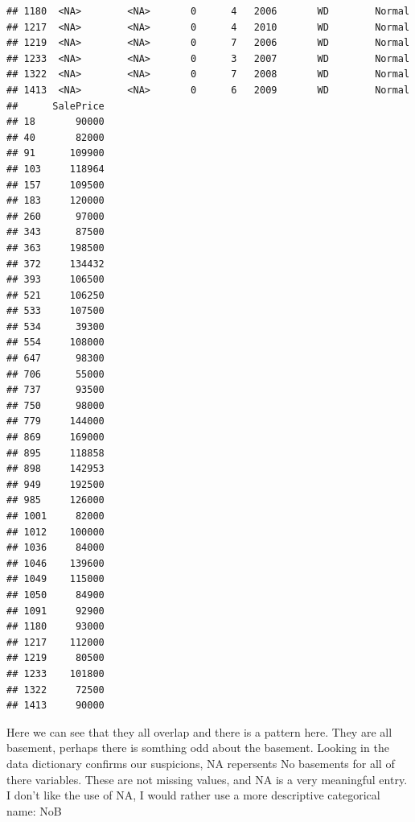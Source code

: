 \documentclass[]{article}
\begin{document}
\begin{verbatim}
## 1180  <NA>        <NA>       0      4   2006       WD        Normal
## 1217  <NA>        <NA>       0      4   2010       WD        Normal
## 1219  <NA>        <NA>       0      7   2006       WD        Normal
## 1233  <NA>        <NA>       0      3   2007       WD        Normal
## 1322  <NA>        <NA>       0      7   2008       WD        Normal
## 1413  <NA>        <NA>       0      6   2009       WD        Normal
##      SalePrice
## 18       90000
## 40       82000
## 91      109900
## 103     118964
## 157     109500
## 183     120000
## 260      97000
## 343      87500
## 363     198500
## 372     134432
## 393     106500
## 521     106250
## 533     107500
## 534      39300
## 554     108000
## 647      98300
## 706      55000
## 737      93500
## 750      98000
## 779     144000
## 869     169000
## 895     118858
## 898     142953
## 949     192500
## 985     126000
## 1001     82000
## 1012    100000
## 1036     84000
## 1046    139600
## 1049    115000
## 1050     84900
## 1091     92900
## 1180     93000
## 1217    112000
## 1219     80500
## 1233    101800
## 1322     72500
## 1413     90000
\end{verbatim}

Here we can see that they all overlap and there is a pattern here. They
are all basement, perhaps there is somthing odd about the basement.
Looking in the data dictionary confirms our suspicions, NA repersents No
basements for all of there variables. These are not missing values, and
NA is a very meaningful entry. I don't like the use of NA, I would
rather use a more descriptive categorical name: NoB
\end{document}
